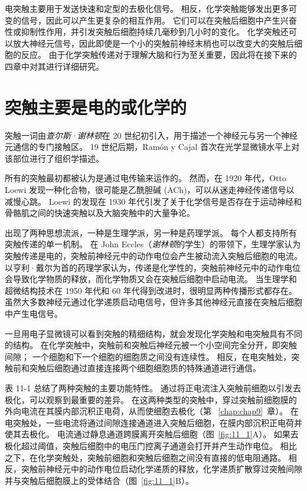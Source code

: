 电突触主要用于发送快速和定型的去极化信号。
相反，化学突触能够发出更多可变的信号，因此可以产生更复杂的相互作用。
它们可以在突触后细胞中产生兴奋性或抑制性作用，并引发突触后细胞持续几毫秒到几小时的变化。
化学突触还可以放大神经元信号，因此即使是一个小的突触前神经末梢也可以改变大的突触后细胞的反应。
由于化学突触传递对于理解大脑和行为至关重要，因此将在接下来的四章中对其进行详细研究。



\section{突触主要是电的或化学的}

突触一词由\textit{查尔斯·谢林顿}在 20 世纪初引入，用于描述一个神经元与另一个神经元通信的专门接触区。
19 世纪后期，Ramón y Cajal 首次在光学显微镜水平上对该部位进行了组织学描述。


所有的突触最初都被认为是通过电传输来运作的。
然而，在 1920 年代，Otto Loewi 发现一种化合物，很可能是乙酰胆碱 (ACh)，可以从迷走神经传递信号以减慢心跳。
Loewi 的发现在 1930 年代引发了关于化学信号是否存在于运动神经和骨骼肌之间的快速突触以及大脑突触中的大量争论。


出现了两种思想流派，一种是生理学派，另一种是药理学派。
每个人都支持所有突触传递的单一机制。
在 John Eccles（\textit{谢林顿}的学生）的带领下，生理学家认为突触传递是电的，突触前神经元中的动作电位会产生被动流入突触后细胞的电流。
以亨利·戴尔为首的药理学家认为，传递是化学性的，突触前神经元中的动作电位会导致化学物质的释放，而化学物质又会在突触后细胞中启动电流。
当生理学和超微结构技术在 1950 年代和 60 年代得到改进时，很明显两种传播形式都存在。
虽然大多数神经元通过化学递质启动电信号，但许多其他神经元直接在突触后细胞中产生电信号。


一旦用电子显微镜可以看到突触的精细结构，就会发现化学突触和电突触具有不同的结构。
在化学突触中，突触前和突触后神经元被一个小空间完全分开，即突触间隙；
一个细胞和下一个细胞的细胞质之间没有连续性。
相反，在电突触处，突触前和突触后细胞通过直接连接两个细胞细胞质的特殊通道进行通信。


表 11-1 总结了两种突触的主要功能特性。
通过将正电流注入突触前细胞以引发去极化，可以观察到最重要的差异。
在这两种类型的突触中，穿过突触前细胞膜的外向电流在其膜内部沉积正电荷，从而使细胞去极化（第 ~\ref{chap:chap9}~章）。 
在电突触处，一些电流将通过间隙连接通道进入突触后细胞，在膜内部沉积正电荷并使其去极化。
电流通过静息通道跨膜离开突触后细胞（图~\ref{fig:11_1}A）。 
如果去极化超过阈值，突触后细胞中的电压门控离子通道会打开并产生动作电位。
相比之下，在化学突触处，突触前细胞和突触后细胞之间没有直接的低电阻通路。
相反，突触前神经元中的动作电位启动化学递质的释放，化学递质扩散穿过突触间隙并与突触后细胞膜上的受体结合（图~\ref{fig:11_1}B）。


